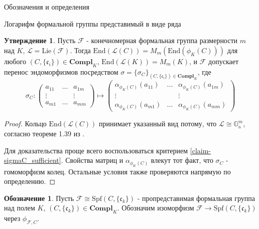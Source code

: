 \documentclass[a4paper,14pt]{extarticle}
\theoremstyle{definition}
\newtheorem{denotation}[definition]{Обозначение}
\newtheorem{claim}[theorem]{Утверждение}
\newcommand{\End}[1]{\mathrm{End}\left(#1\right)}
\newcommand{\Compl}[1]{\mathbf{Compl}_{#1}}
\newcommand{\forget}[1]{\phi_{#1}}
\newcommand{\Lie}[1]{\mathrm{Lie}\left(#1\right)}
\newcommand{\Spf}[1]{\mathrm{Spf}\left(#1\right)}
\newcommand{\bG}{\mathbb{G}}
\newcommand{\fc}{\mathfrak{c}}
\newcommand{\sF}{\mathscr{F}}
\newcommand{\sL}{\mathscr{L}}
\newcommand{\Ga}{\bG_{\mathrm{a}}}
\begin{document}
\begin{section}{Обозначения и определения}
\begin{subsection}{Логарифм формальной группы представимый в виде ряда}
\begin{claim}\label{claim-end_traslation_for_finite_F}
    Пусть $\sF$ - конечномерная формальная группа размерности $m$ над $K$, ${ \sL = \Lie{\sF} }$. Тогда ${ \End{\sL(C)} = M_m\left(\End{\forget{K}(C)}\right) }$ для любого ${ (C, \{\fc_i\}) \in \Compl{K} }$, ${ \End{\sL(K)} = M_m(K) }$, и $\sF$ допускает перенос эндоморфизмов посредством ${ \sigma = \{ \sigma_C \}_{(C, \{ \fc_i \}) \in \Compl{K}} }$, где
    \begin{equation*}
        \sigma_C :
        \left(
            \begin{matrix}
                a_{1 1} & \hdots & a_{1 m} \\
                \vdots & & \vdots \\
                a_{m 1} & \hdots & a_{m m}
            \end{matrix}
        \right) \mapsto
        \left(
            \begin{matrix}
                \alpha_{\forget{K}(C)}(a_{1 1}) &
                \hdots &
                \alpha_{\forget{K}(C)}(a_{1 m}) \\
                \vdots & & \vdots \\
                \alpha_{\forget{K}(C)}(a_{m 1}) &
                \hdots &
                \alpha_{\forget{K}(C)}(a_{m m})
            \end{matrix}
        \right)
    \end{equation*}
\end{claim}
\begin{proof}
    Кольцо $\End{\sL(C)}$ принимает указанный вид потому, что ${ \sL \cong \Ga^m }$, согласно теореме 1.39 из \cite{ZinkLectures}.

    Для доказательства проще всего воспользоваться критерием \ref{claim-sigmaC_sufficient}. Свойства матриц и $\alpha_{\forget{K}(C)}$ влекут тот факт, что $\sigma_C$ - гомоморфизм колец. Остальные условия также проверяются напрямую по определению.
\end{proof}

\begin{denotation}
    Пусть ${ \sF \cong \Spf{C, \{\fc_k\}} }$ - пропредставимая формальная группа над полем $K$, ${ (C, \{ \fc_k \}) \in \Compl{K} }$. Обозначим изоморфизм ${ \sF \rightarrow \Spf{C, \{\fc_k\}} }$ через $\forget{\sF, C}$.
\end{denotation}


\end{subsection}
\end{section}
\end{document}

